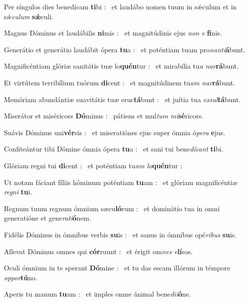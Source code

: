 \documentclass[12pt]{article} %
\newenvironment{psalmtext}{\leftskip 0.25in}{\vspace{1 mm}}
\let\oldgresixstar\gresixstar
\renewcommand{\gresixstar}{\textcolor{benred8}{\oldgresixstar}}
\begin{document}
\begin{psalmtext}
Per síngulos dies benedícam \textbf{ti}bi : \gresixstar\ et laudábo nomen tuum in sǽculum et in sǽ\emph{culum} \textbf{sǽ}culi.

Magnus Dóminus et laudábilis \textbf{ni}mis : \gresixstar\ et magnitúdinis ejus \emph{non e} \textbf{fi}nis.

Generátio et generátio laudábit ópera \textbf{tu}a : \gresixstar\ et poténtiam tuam pro\emph{nunti}\textbf{á}bunt.

Magnificéntiam glóriæ sanitátis tuæ lo\textbf{quén}tur : \gresixstar\ et mirabília tu\emph{a nar}\textbf{rá}bunt.

Et virtútem terribílium tuórum \textbf{di}cent : \gresixstar\ et magnitúdinem tu\emph{am nar}\textbf{rá}bunt.

Memóriam abundántiæ suavitátis tuæ eruc\textbf{tá}bunt : \gresixstar\ et juítia tua \emph{exsul}\textbf{tá}bunt.

Miserátor et miséricors \textbf{Dó}minus : \gresixstar\ pátiens et mul\emph{tum mi}\textbf{sé}ricors.

Suávis Dóminus uni\textbf{vér}sis : \gresixstar\ et miseratiónes ejus super ómnia ó\emph{pera} \textbf{e}jus.

Confiteántur tibi Dómine ómnia ópera \textbf{tu}a : \gresixstar\ et sani tui bene\emph{dícant} \textbf{ti}bi.

Glóriam regni tui \textbf{di}cent : \gresixstar\ et poténtiam tu\emph{am lo}\textbf{quén}tur :

Ut notam fáciant fíliis hóminum poténtiam \textbf{tu}am : \gresixstar\ et glóriam magnificéntiæ \emph{regni} \textbf{tu}i.

Regnum tuum regnum ómnium sæcu\textbf{ló}rum : \gresixstar\ et dominátio tua in omni generatióne et gene\emph{rati}\textbf{ó}nem.

Fidélis Dóminus in ómnibus verbis \textbf{su}is : \gresixstar\ et sanus in ómnibus opé\emph{ribus} \textbf{su}is.

Allevat Dóminus omnes qui \textbf{cór}ruunt : \gresixstar\ et érigit om\emph{nes e}\textbf{lí}sos.

Oculi ómnium in te sperant \textbf{Dó}mine : \gresixstar\ et tu das escam illórum in témpore \emph{oppor}\textbf{tú}no.

Aperis tu manum \textbf{tu}am : \gresixstar\ et imples omne ánimal bene\emph{dii}\textbf{ó}ne.


\end{psalmtext}
\end{document}
